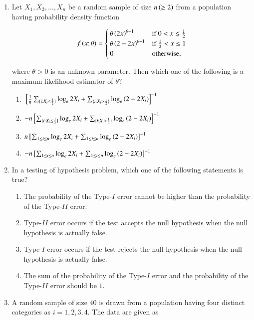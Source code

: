 \documentclass[journal]{IEEEtran}
\numberwithin{equation}{enumi}
\numberwithin{figure}{enumi}
\newcommand{\lt}{<}
\newcommand{\gt}{>}
\begin{document}
\begin{enumerate}
\item Let $X_1, X_2, \dots, X_n$ be a random sample of size $n \left(\geq 2\right)$ from a population having probability density function

\[
f\brak{x; \theta} = \begin{cases}
\theta\brak{2x}^{\theta-1} & \text{if } 0 \lt x \leq \frac{1}{2} \\
\theta\brak{2-2x}^{\theta-1} & \text{if } \frac{1}{2} \lt x \leq 1 \\
0 & \text{otherwise,}
\end{cases}
\]

where $\theta \gt 0$ is an unknown parameter. Then which one of the following is a maximum likelihood estimator of $\theta$?

\begin{enumerate}
    \item $\sbrak{\frac{1}{n} \sum_{\{i: X_i \leq \frac{1}{2}\}} \log_e 2X_i + \sum_{\{i: X_i \gt \frac{1}{2}\}} \log_e \brak{2-2X_i}}^{-1}$
    \item $-n \sbrak{\sum_{\{i: X_i \leq \frac{1}{2}\}} \log_e 2X_i + \sum_{\{i: X_i \gt \frac{1}{2}\}} \log_e \brak{2-2X_i}}^{-1}$
    \item $n {}\left[\sum_{1 \leq i \leq n} \log_e 2X_i + \sum_{1 \leq i \leq n} \log_e \left(2-2X_i\right)\right]^{-1}$
    \item $-n {}\left[\sum_{1 \leq i \leq n} \log_e 2X_i + \sum_{1 \leq i \leq n} \log_e \left(2-2X_i\right)\right]^{-1}$
\end{enumerate}

\item In a testing of hypothesis problem, which one of the following statements is true?

\begin{enumerate}
    \item The probability of the Type-$I$ error cannot be higher than the probability of the Type-$II$ error.
    \item Type-$II$ error occurs if the test accepts the null hypothesis when the null hypothesis is actually false.
    \item Type-$I$ error occurs if the test rejects the null hypothesis when the null hypothesis is actually false.
    \item The sum of the probability of the Type-$I$ error and the probability of the Type-$II$ error should be $1$.
\end{enumerate}

\item A random sample of size $40$ is drawn from a population having four distinct categories as $i = 1, 2, 3, 4$. The data are given as


\end{enumerate}
\end{document}
